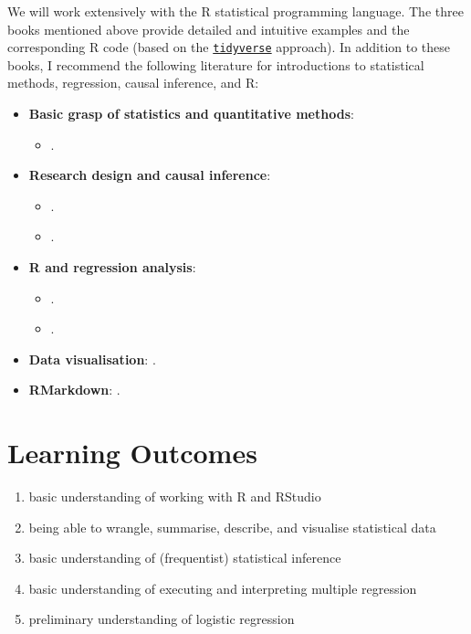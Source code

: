 \documentclass[abstract=on,parskip=full,headings=standardclasses,fontsize=11pt,paper=a4]{scrartcl}
\begin{document}
We will work extensively with the \textsf{R} statistical programming language. The three books mentioned above \autocite{ismay20,wickham17,healy19}   provide detailed and intuitive examples and the corresponding \textsf{R} code (based on the \href{https://www.tidyverse.org}{\texttt{tidyverse}} approach). In addition to these books, I recommend the following literature for introductions to statistical methods, regression, causal inference, and \textsf{R}:

\begin{itemize}
\item \textbf{Basic grasp of statistics and quantitative methods}: 
\begin{itemize}
\item {}.
\end{itemize}

\item \textbf{Research design and causal inference}: 
\begin{itemize}
\item {}.
\item {}.
\end{itemize}
\item \textbf{\textsf{R} and regression analysis}: 
\begin{itemize}
\item {}.
\item {}.
\end{itemize}
\item \textbf{Data visualisation}: .
\item \textbf{RMarkdown}: .
\end{itemize}

\section*{Learning Outcomes}

\begin{enumerate}
\item basic understanding of working with \textsf{R} and RStudio
\item being able to wrangle, summarise, describe, and visualise statistical data
\item  basic understanding of (frequentist) statistical inference
\item  basic understanding of executing and interpreting multiple regression
\item  preliminary understanding of logistic regression
\end{enumerate}
\end{document}
